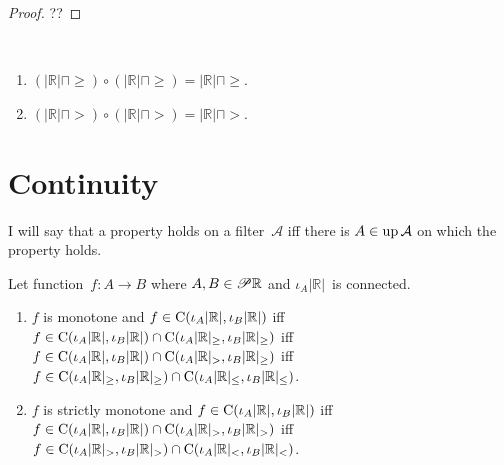\begin{proof}
??
\end{proof}

\begin{conjecture}
~
\begin{enumerate}
\item $(|\mathbb{R}| \sqcap {\geq}) \circ (|\mathbb{R}| \sqcap {\geq}) = |\mathbb{R}| \sqcap {\geq}$.
\item $(|\mathbb{R}| \sqcap {>}) \circ (|\mathbb{R}| \sqcap {>}) = |\mathbb{R}| \sqcap {>}$.
\end{enumerate}
\end{conjecture}

\section{Continuity}

I will say that a property holds on a filter~$\mathcal{A}$ iff there is $A\in\operatorname{up}\mathcal{A}$ on which the property holds.


\begin{lem}
Let function~$f:A\rightarrow B$ where
$A,B\in\mathscr{P}\mathbb{R}$ and $\iota_A|\mathbb{R}|$~is connected.
\begin{enumerate}
\item $f$ is monotone and $f\in\mathrm{C}(\iota_A|\mathbb{R}|,\iota_B|\mathbb{R}|)$ iff
$f\in\mathrm{C}(\iota_A|\mathbb{R}|,\iota_B|\mathbb{R}|)\cap\mathrm{C}(\iota_{A}|\mathbb{R}|_{\geq},\iota_{B}|\mathbb{R}|_{\geq})$ iff
$f\in\mathrm{C}(\iota_A|\mathbb{R}|,\iota_B|\mathbb{R}|)\cap\mathrm{C}(\iota_{A}|\mathbb{R}|_{>},\iota_{B}|\mathbb{R}|_{\geq})$ iff
$f\in\mathrm{C}(\iota_{A}|\mathbb{R}|_{\geq},\iota_{B}|\mathbb{R}|_{\geq})\cap
\mathrm{C}(\iota_{A}|\mathbb{R}|_{\leq},\iota_{B}|\mathbb{R}|_{\leq})$.
\item $f$ is strictly monotone and $f\in\mathrm{C}(\iota_A|\mathbb{R}|,\iota_B|\mathbb{R}|)$ iff
$f\in\mathrm{C}(\iota_A|\mathbb{R}|,\iota_B|\mathbb{R}|)\cap\mathrm{C}(\iota_{A}|\mathbb{R}|_{>},\iota_{B}|\mathbb{R}|_{>})$ iff
$f\in\mathrm{C}(\iota_{A}|\mathbb{R}|_{>},\iota_{B}|\mathbb{R}|_{>})\cap
\mathrm{C}(\iota_{A}|\mathbb{R}|_{<},\iota_{B}|\mathbb{R}|_{<})$.
\end{enumerate}
\end{lem}

